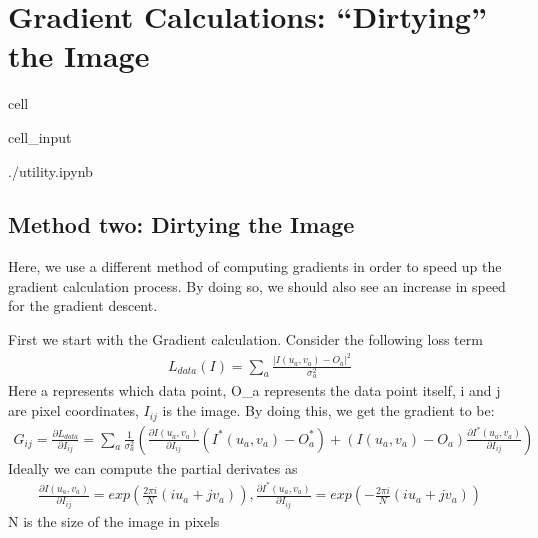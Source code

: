 \documentclass[letterpaper,10pt,english]{jupyterBook}
\begin{document}
\chapter{Gradient Calculations: “Dirtying” the Image}
\label{\detokenize{dirty_gradient:gradient-calculations-dirtying-the-image}}\label{\detokenize{dirty_gradient::doc}}
\begin{sphinxuseclass}{cell}\begin{sphinxVerbatimInput}

\begin{sphinxuseclass}{cell_input}
\begin{sphinxVerbatim}[commandchars=\\\{\}]
 ./utility.ipynb
\end{sphinxVerbatim}

\end{sphinxuseclass}\end{sphinxVerbatimInput}

\end{sphinxuseclass}

\section{Method two: Dirtying the Image}
\label{\detokenize{dirty_gradient:method-two-dirtying-the-image}}
\sphinxAtStartPar
Here, we use a different method of computing gradients in order to speed up the gradient calculation process. By doing so, we should also see an increase in speed for the gradient descent.

\sphinxAtStartPar
First we start with the Gradient calculation. Consider the following loss term
\begin{equation*}
\begin{split}L_{data}(I) = \sum_a\frac{|I(u_a,v_a)-O_a|^2}{\sigma_a^2}\end{split}
\end{equation*}
\sphinxAtStartPar
Here a represents which data point, O\_a represents the data point itself, i and j are pixel coordinates, \(I_{ij}\) is the image. By doing this, we get the gradient to be:
\begin{equation*}
\begin{split}G_{ij} = \frac{\partial L_{data}}{\partial I_{ij}} = \sum_a \frac{1}{\sigma_a^2}(\frac{\partial I(u_a,v_a)}{\partial I_{ij}}(I^*(u_a,v_a)-O_a^*) + (I(u_a,v_a)-O_a)\frac{\partial I^*(u_a,v_a)}{\partial I_{ij}})\end{split}
\end{equation*}
\sphinxAtStartPar
Ideally we can compute the partial derivates as
\begin{equation*}
\begin{split}\frac{\partial I(u_a,v_a)}{\partial I_{ij}} = exp(\frac{2\pi i}{N}(iu_a+jv_a)), \frac{\partial I^*(u_a,v_a)}{\partial I_{ij}} = exp(-\frac{2\pi i}{N}(iu_a+jv_a))\end{split}
\end{equation*}
\sphinxAtStartPar
N is the size of the image in pixels
\end{document}
